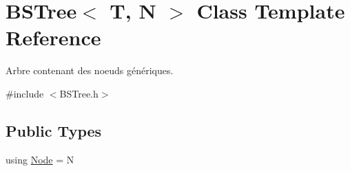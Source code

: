 \hypertarget{classBSTree}{}\section{B\+S\+Tree$<$ T, N $>$ Class Template Reference}
\label{classBSTree}


Arbre contenant des noeuds génériques.  




{\ttfamily \#include $<$B\+S\+Tree.\+h$>$}

\subsection*{Public Types}
\begin{DoxyCompactItemize}
\item 
using \hyperlink{classBSTree_a9c1a06548b3ff425e1d906f17ce2c858}{Node} = N
\end{DoxyCompactItemize}
